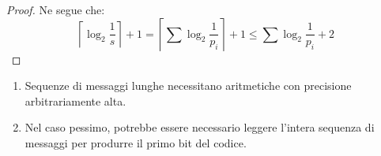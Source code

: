 \documentclass[\main/main.tex]{subfiles}
\begin{document}
\begin{multicols}{2}
\begin{proof}
    Ne segue che:
    \[
        \left\lceil\log _{2} \frac{1}{s}\right\rceil+ 1=\left\lceil\sum \log _{2} \frac{1}{p_{i}}\right\rceil+ 1 \leq \sum \log _{2} \frac{1}{p_{i}}+2
    \]
\end{proof}
\begin{observation}
    \begin{enumerate}
        \item Sequenze di messaggi lunghe necessitano aritmetiche con precisione arbitrariamente alta.
        \item Nel caso pessimo, potrebbe essere necessario leggere l'intera sequenza di messaggi per produrre il primo bit del codice.
    \end{enumerate}
\end{observation}
\end{multicols}
\end{document}
